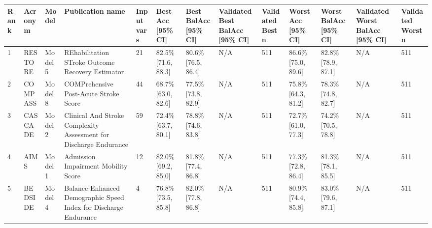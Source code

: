 \begin{tabular}{lllllllllllll}
\hline
Rank & Acronym & Model & Publication name & Input vars & Best Acc [95\% CI] & Best BalAcc [95\% CI] & Validated Best BalAcc [95\% CI] & Validated Best n & Worst Acc [95\% CI] & Worst BalAcc [95\% CI] & Validated Worst BalAcc [95\% CI] & Validated Worst n \\
\hline
1 & RESTORE & Model 5 & REhabilitation STroke Outcome Recovery Estimator & 21 & 82.5\% [71.6, 88.3] & 80.6\% [76.5, 86.4] & N/A & 511 & 86.6\% [75.0, 89.6] & 82.8\% [78.9, 87.1] & N/A & 511 \\
2 & COMPASS & Model 8 & COMPrehensive Post-Acute Stroke Score & 44 & 68.7\% [63.0, 82.6] & 77.5\% [73.8, 82.9] & N/A & 511 & 75.8\% [64.3, 81.2] & 78.3\% [74.8, 82.7] & N/A & 511 \\
3 & CASCADE & Model 2 & Clinical And Stroke Complexity Assessment for Discharge Endurance & 59 & 72.4\% [63.7, 80.1] & 78.8\% [74.6, 83.8] & N/A & 511 & 72.7\% [61.0, 77.3] & 74.2\% [70.5, 78.8] & N/A & 511 \\
4 & AIMS & Model 1 & Admission Impairment Mobility Score & 12 & 82.0\% [69.2, 85.0] & 81.8\% [77.4, 86.8] & N/A & 511 & 77.3\% [72.8, 86.4] & 81.3\% [78.1, 85.5] & N/A & 511 \\
5 & BEDSIDE & Model 4 & Balance-Enhanced Demographic Speed Index for Discharge Endurance & 4 & 76.8\% [73.5, 85.8] & 82.0\% [77.8, 86.8] & N/A & 511 & 80.9\% [74.4, 85.8] & 83.0\% [79.6, 87.1] & N/A & 511 \\
\hline
\end{tabular}

